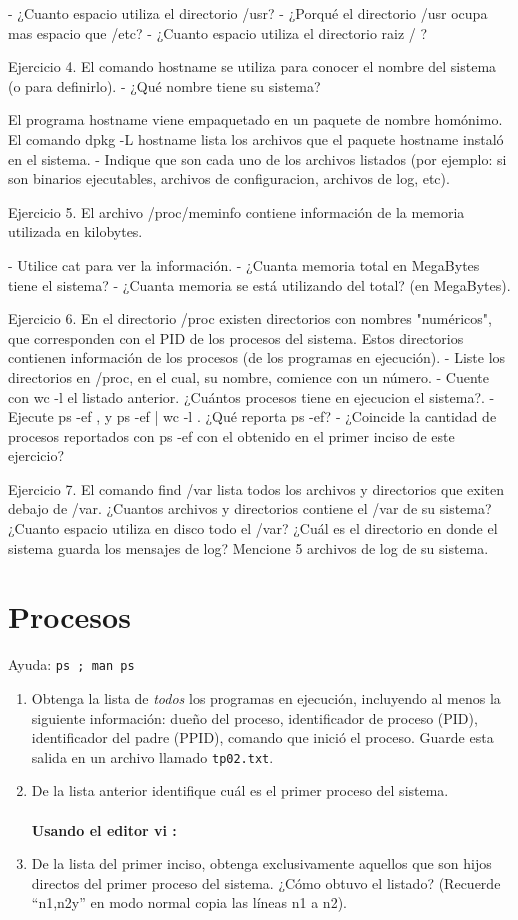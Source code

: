 \documentclass[12pt]{article}
\begin{document}
- ¿Cuanto espacio utiliza el directorio /usr?
- ¿Porqué el directorio /usr ocupa mas espacio que /etc?
- ¿Cuanto espacio utiliza el directorio raiz / ?


Ejercicio 4.
El comando hostname se utiliza para conocer el nombre del sistema (o para definirlo).
- ¿Qué nombre tiene su sistema?

El programa hostname viene empaquetado en un paquete de nombre homónimo.
El comando dpkg -L hostname  lista los archivos que el paquete hostname instaló en el sistema.
- Indique que son cada uno de los archivos listados (por ejemplo: si son binarios ejecutables, archivos de configuracion, archivos de log, etc).



Ejercicio 5.
El archivo /proc/meminfo contiene información de la memoria utilizada en kilobytes.

- Utilice cat para ver la información.
- ¿Cuanta memoria total en MegaBytes tiene el sistema?
- ¿Cuanta memoria se está utilizando del total? (en MegaBytes).


Ejercicio 6.
En el directorio /proc existen directorios con nombres "numéricos", que corresponden con el PID de los procesos del sistema.
Estos directorios contienen información de los procesos (de los programas en ejecución).
- Liste los directorios en /proc, en el cual, su nombre, comience con un número.
- Cuente con wc -l el listado anterior. ¿Cuántos procesos tiene en ejecucion el sistema?.
- Ejecute ps -ef , y ps -ef | wc -l . ¿Qué reporta ps -ef?
- ¿Coincide la cantidad de procesos reportados con ps -ef con el obtenido en el primer inciso de este ejercicio?


Ejercicio 7.
El comando find /var lista todos los archivos y directorios que exiten debajo de /var.
¿Cuantos archivos y directorios contiene el /var de su sistema?
¿Cuanto espacio utiliza en disco todo el /var?
¿Cuál es el directorio en donde el sistema guarda los mensajes de log?
Mencione 5 archivos de log de su sistema.







\section*{Procesos}
Ayuda: \texttt{ps ; man ps}
\begin{enumerate}
\item Obtenga la lista de \textit{todos} los programas en ejecución, incluyendo al menos la siguiente información:
dueño del proceso, identificador de proceso (PID), identificador del padre (PPID),
comando que inició el proceso. Guarde esta salida en un archivo llamado \texttt{tp02.txt}.
\item De la lista anterior identifique cuál es el primer proceso del sistema. \\ \\
\textbf{Usando el editor vi :} 
\item De la lista del primer inciso, obtenga exclusivamente aquellos que son hijos directos del primer proceso del sistema. ¿Cómo obtuvo el listado? (Recuerde ``n1,n2y'' en modo normal copia las líneas n1 a n2).
\end{enumerate}
\end{document}
